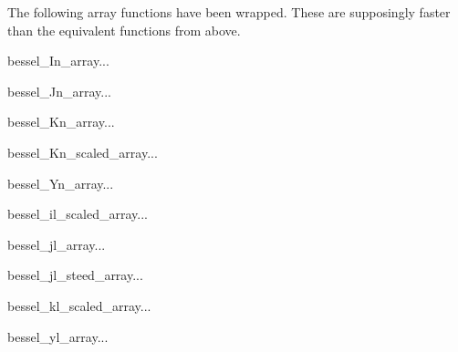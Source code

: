 The following array functions have been wrapped. These are supposingly faster
than the equivalent functions from above.
\begin{funcdesc}{bessel_In_array}{...}
\end{funcdesc}
\begin{funcdesc}{bessel_Jn_array}{...}
\end{funcdesc}
\begin{funcdesc}{bessel_Kn_array}{...}
\end{funcdesc}
\begin{funcdesc}{bessel_Kn_scaled_array}{...}
\end{funcdesc}
\begin{funcdesc}{bessel_Yn_array}{...}
\end{funcdesc}
\begin{funcdesc}{bessel_il_scaled_array}{...}
\end{funcdesc}
\begin{funcdesc}{bessel_jl_array}{...}
\end{funcdesc}
\begin{funcdesc}{bessel_jl_steed_array}{...}
\end{funcdesc}
\begin{funcdesc}{bessel_kl_scaled_array}{...}
\end{funcdesc}
\begin{funcdesc}{bessel_yl_array}{...}
\end{funcdesc}


